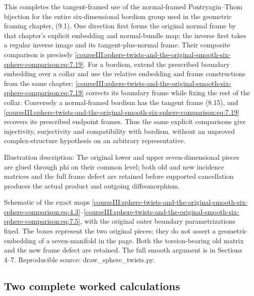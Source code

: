 This completes the tangent-framed use of the normal-framed Pontryagin--Thom bijection for the entire six-dimensional bordism group used in the geometric framing chapter, (9.1). One direction first forms the original normal frame by that chapter's explicit embedding and normal-bundle map; the inverse first takes a regular inverse image and its tangent-plus-normal frame. Their composite comparison is precisely \eqref{courseIII:sphere-twists-and-the-original-smooth-six-sphere-comparison:eq:7.19}. For a bordism, extend the prescribed boundary embedding over a collar and use the relative embedding and frame constructions from the same chapter; \eqref{courseIII:sphere-twists-and-the-original-smooth-six-sphere-comparison:eq:7.19} corrects its boundary frame while fixing the rest of the collar. Conversely a normal-framed bordism has the tangent frame (8.15), and \eqref{courseIII:sphere-twists-and-the-original-smooth-six-sphere-comparison:eq:7.19} recovers its prescribed endpoint frames. Thus the same explicit comparisons give injectivity, surjectivity and compatibility with bordism, without an unproved complex-structure hypothesis on an arbitrary representative.

Illustration description: The original lower and upper seven-dimensional pieces are glued through phi on their common level; both old and new incidence matrices and the full frame defect are retained before supported cancellation produces the actual product and outgoing diffeomorphism.

Schematic of the exact maps \eqref{courseIII:sphere-twists-and-the-original-smooth-six-sphere-comparison:eq:4.3}--\eqref{courseIII:sphere-twists-and-the-original-smooth-six-sphere-comparison:eq:7.5}, with the original outer boundary parametrizations fixed. The boxes represent the two original pieces; they do not assert a geometric embedding of a seven-manifold in the page. Both the torsion-bearing old matrix and the new frame defect are retained. The full smooth argument is in Sections 4--7. Reproducible source: draw\_sphere\_twists.py.

\subsection{Two complete worked calculations}
\label{courseIII:sphere-twists-and-the-original-smooth-six-sphere-comparison:twist-worked-exercises}

\label{courseIII:sphere-twists-and-the-original-smooth-six-sphere-comparison:section-8}

